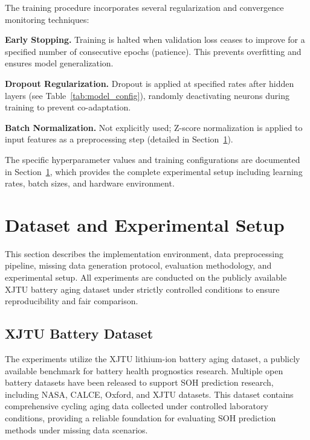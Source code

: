 \documentclass[5p,times]{elsarticle}
\begin{document}
The training procedure incorporates several regularization and convergence monitoring techniques:

\textbf{Early Stopping.} Training is halted when validation loss ceases to improve for a specified number of consecutive epochs (patience). This prevents overfitting and ensures model generalization.

\textbf{Dropout Regularization.} Dropout is applied at specified rates after hidden layers (see Table~\ref{tab:model_config}), randomly deactivating neurons during training to prevent co-adaptation.

\textbf{Batch Normalization.} Not explicitly used; Z-score normalization is applied to input features as a preprocessing step (detailed in Section~\ref{sec:dataset}).

The specific hyperparameter values and training configurations are documented in Section~\ref{sec:dataset}, which provides the complete experimental setup including learning rates, batch sizes, and hardware environment.

\section{Dataset and Experimental Setup}\label{sec:dataset}

This section describes the implementation environment, data preprocessing pipeline, missing data generation protocol, evaluation methodology, and experimental setup. All experiments are conducted on the publicly available XJTU battery aging dataset under strictly controlled conditions to ensure reproducibility and fair comparison.

\subsection{XJTU Battery Dataset}\label{sec:xjtu}

The experiments utilize the XJTU lithium-ion battery aging dataset\cite{wang2024open,duan2025lithium,wang2024pinn}, a publicly available benchmark for battery health prognostics research. Multiple open battery datasets have been released to support SOH prediction research, including NASA, CALCE, Oxford, and XJTU datasets\cite{severson2019data}. This dataset contains comprehensive cycling aging data collected under controlled laboratory conditions, providing a reliable foundation for evaluating SOH prediction methods under missing data scenarios.
\end{document}
